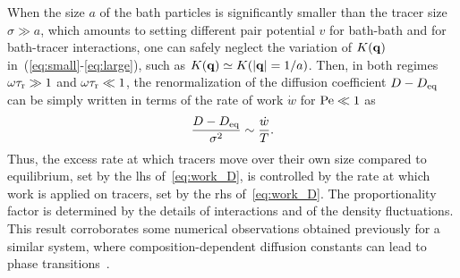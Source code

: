 \documentclass[pre, superscriptaddress, twocolumn,pre]{revtex4-1}
\begin{document}
When the size $a$ of the bath particles is significantly smaller than the tracer size $\sigma\gg a$, which amounts to setting different pair potential $v$ for bath-bath and for bath-tracer interactions, one can safely neglect the variation of $K({\bf q})$ in~(\ref{eq:small}-\ref{eq:large}), such as $K({\bf q}) \simeq K(|{\bf q}|=1/a)$. Then, in both regimes $\omega\tau_{\rm r}\gg 1$ and $\omega\tau_{\rm r}\ll 1$, the renormalization of the diffusion coefficient $D-D_{\rm eq}$ can be simply written in terms of the rate of work $\dot w$ for ${\rm Pe}\ll1$ as
\begin{equation}\label{eq:work_D}
	\frac{D-D_{\rm eq}}{\sigma^2} \sim \frac{\dot w}{T} .
\end{equation}
Thus, the excess rate at which tracers move over their own size compared to equilibrium, set by the lhs of~\eqref{eq:work_D}, is controlled by the rate at which work is applied on tracers, set by the rhs of~\eqref{eq:work_D}. The proportionality factor is determined by the details of interactions and of the density fluctuations. This result corroborates some numerical observations obtained previously for a similar system, where composition-dependent diffusion constants can lead to phase transitions~\cite{delJunco2018}.
\end{document}

